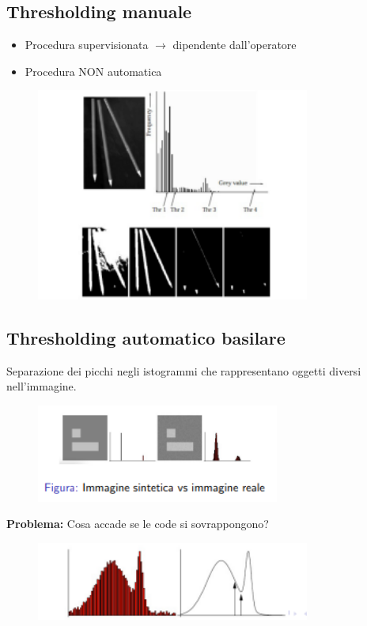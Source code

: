 \subsection{Thresholding manuale}
\begin{itemize}
    \item Procedura supervisionata $\rightarrow$ dipendente dall'operatore
    \item Procedura NON automatica
\end{itemize}

\begin{figure}[H]
    \centering
    \includegraphics[width=9cm, keepaspectratio]{capitoli/immagini/imgs/trash-manuale.png}
\end{figure}

\subsection{Thresholding automatico basilare}

Separazione dei picchi negli istogrammi che rappresentano oggetti diversi
nell'immagine.

\begin{figure}[H]
    \centering
    \includegraphics[width=8cm, keepaspectratio]{capitoli/immagini/imgs/trash-automatico-basilare.png}
\end{figure}

\textbf{Problema:} Cosa accade se le code si sovrappongono?

\begin{figure}[H]
    \centering
    \includegraphics[width=9cm, keepaspectratio]{capitoli/immagini/imgs/trash-automatico-basilare2.png}
\end{figure}

